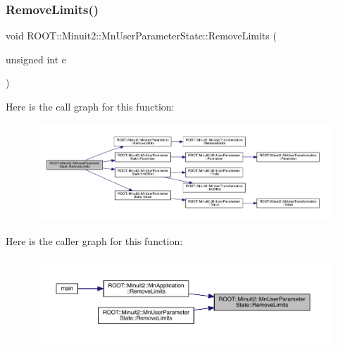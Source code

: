 \mbox{\label{classROOT_1_1Minuit2_1_1MnUserParameterState_a1ae57d606384e08b0e710c4908543524}} 
\subsubsection{\texorpdfstring{RemoveLimits()}{RemoveLimits()}\hspace{0.1cm}{\footnotesize\ttfamily [2/4]}}
{\footnotesize\ttfamily void R\+O\+O\+T\+::\+Minuit2\+::\+Mn\+User\+Parameter\+State\+::\+Remove\+Limits (\begin{DoxyParamCaption}\item[{unsigned int}]{e }\end{DoxyParamCaption})}

Here is the call graph for this function\+:\nopagebreak
\begin{figure}[H]
\begin{center}
\leavevmode
\includegraphics[width=350pt]{d3/de0/classROOT_1_1Minuit2_1_1MnUserParameterState_a1ae57d606384e08b0e710c4908543524_cgraph}
\end{center}
\end{figure}
Here is the caller graph for this function\+:\nopagebreak
\begin{figure}[H]
\begin{center}
\leavevmode
\includegraphics[width=350pt]{d3/de0/classROOT_1_1Minuit2_1_1MnUserParameterState_a1ae57d606384e08b0e710c4908543524_icgraph}
\end{center}
\end{figure}
\mbox{\label{classROOT_1_1Minuit2_1_1MnUserParameterState_ac71dfd669559be76ed62fdf221a017d5}} 
